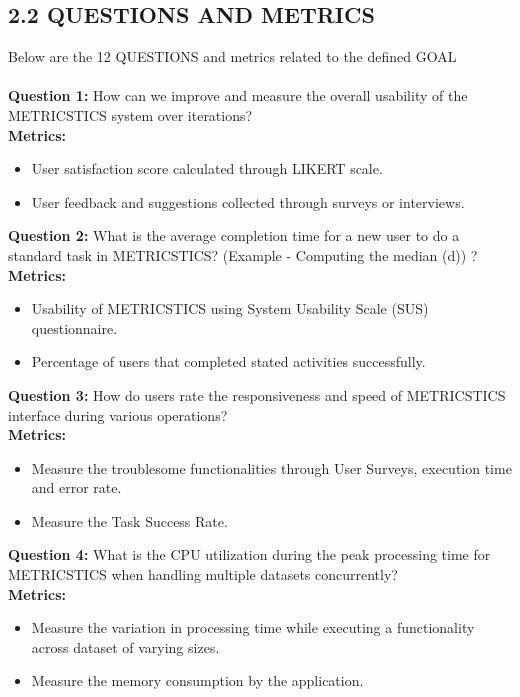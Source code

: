 \subsection{2.2 QUESTIONS AND METRICS}
Below are the 12 QUESTIONS and metrics related to the defined GOAL  \\ \\
\textbf{Question 1:} How can we improve and measure the overall usability of the METRICSTICS system over iterations?
 \\
\textbf{Metrics:}
\begin{itemize}
    \item User satisfaction score calculated through LIKERT scale.
    \item User feedback and suggestions collected through surveys or interviews.
\end{itemize} 
\vspace{10pt}
\textbf{Question 2:} What is the average completion time for a new user to do a standard task in METRICSTICS? (Example - Computing the median (d)) ? \\
\textbf{Metrics:}
\begin{itemize}
    \item Usability of METRICSTICS using System Usability Scale (SUS) questionnaire.
    \item Percentage of users that completed stated activities successfully. 
\end{itemize}
\vspace{10pt}
\textbf{Question 3:} How do users rate the responsiveness and speed of METRICSTICS interface during various operations? \\
\textbf{Metrics:}
\begin{itemize}
    \item Measure the troublesome functionalities through User Surveys, execution time and error rate.
    \item Measure the Task Success Rate.
\end{itemize}
\vspace{10pt}
\textbf{Question 4:} What is the CPU utilization during the peak processing time for METRICSTICS when handling multiple datasets concurrently?
 \\
\textbf{Metrics:}
\begin{itemize}
    \item Measure the variation in processing time while executing a functionality across dataset of varying sizes.
    \item Measure the memory consumption by the application.
\end{itemize}
